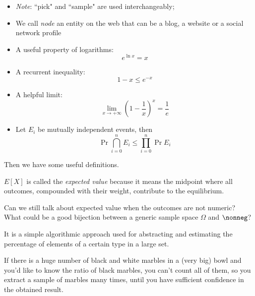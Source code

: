     \begin{itemize}
        \item \textit{Note}: ``pick" and ``sample" are used interchangeably;
        \item We call \emph{node} an entity on the web that can be a blog, a website or a social network profile
        \item A useful property of logarithms:
            \begin{equation}\label{eq:log-prop}
                e^{\ln x} = x
            \end{equation}
        \item A recurrent inequality:
            \begin{equation}\label{eq:e-x}
                1-x \leq e^{-x}
            \end{equation}
        \item A helpful limit:
            \begin{equation}\label{eq:limit-1/e}
                \lim_{x \to +\infty} \left(1 - \frac{1}{x}\right)^x = \frac{1}{e}
            \end{equation}
        \item Let $E_i$ be mutually independent events, then
            \begin{equation}\label{eq:prob}
                \Pr{\bigcap_{i=0}^n E_i} \leq \prod_{i=0}^{n}\Pr{E_i}
            \end{equation}
    \end{itemize}
    
    Then we have some useful definitions.
    
    \begin{defn}
        $E[X]$ is called the \textit{expected value} because it means the midpoint where all outcomes, compounded with their weight, contribute to the equilibrium.
        
        \begin{qst}
            Can we still talk about expected value when the outcomes are not numeric? What could be a good bijection between a generic sample space $\Omega$ and $\nonneg$?
        \end{qst}
    \end{defn}
    
    \begin{defn}[Sampling]
        It is a simple algorithmic approach used for abstracting and estimating the percentage of elements of a certain type in a large set.
        
        \ex If there is a huge number of black and white marbles in a (very big) bowl and you'd like to know the ratio of black marbles, you can't count all of them, so you extract a sample of marbles many times, until you have sufficient confidence in the obtained result.
    \end{defn}
    
